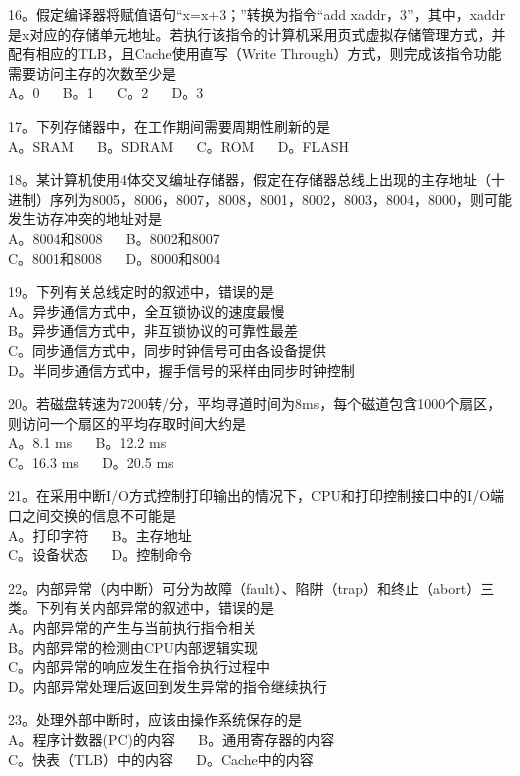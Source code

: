 16。假定编译器将赋值语句“x=x+3；”转换为指令“add xaddr，3”，其中，xaddr是x对应的存储单元地址。若执行该指令的计算机采用页式虚拟存储管理方式，并配有相应的TLB，且Cache使用直写（Write Through）方式，则完成该指令功能需要访问主存的次数至少是 \\
A。0 $\quad$ B。1 $\quad$ C。2 $\quad$ D。3

17。下列存储器中，在工作期间需要周期性刷新的是 \\
A。SRAM $\quad$ B。SDRAM $\quad$ C。ROM $\quad$ D。FLASH

18。某计算机使用4体交叉编址存储器，假定在存储器总线上出现的主存地址（十进制）序列为8005，8006，8007，8008，8001，8002，8003，8004，8000，则可能发生访存冲突的地址对是 \\
A。8004和8008 $\quad$ B。8002和8007 \\
C。8001和8008 $\quad$ D。8000和8004

19。下列有关总线定时的叙述中，错误的是 \\
A。异步通信方式中，全互锁协议的速度最慢 \\
B。异步通信方式中，非互锁协议的可靠性最差 \\
C。同步通信方式中，同步时钟信号可由各设备提供 \\
D。半同步通信方式中，握手信号的采样由同步时钟控制

20。若磁盘转速为7200转/分，平均寻道时间为8ms，每个磁道包含1000个扇区，则访问一个扇区的平均存取时间大约是 \\
A。8.1 ms $\quad$ B。12.2 ms \\
C。16.3 ms $\quad$ D。20.5 ms

21。在采用中断I/O方式控制打印输出的情况下，CPU和打印控制接口中的I/O端口之间交换的信息不可能是 \\
A。打印字符 $\quad$ B。主存地址 \\
C。设备状态 $\quad$ D。控制命令

22。内部异常（内中断）可分为故障（fault）、陷阱（trap）和终止（abort）三类。下列有关内部异常的叙述中，错误的是 \\
A。内部异常的产生与当前执行指令相关 \\
B。内部异常的检测由CPU内部逻辑实现 \\
C。内部异常的响应发生在指令执行过程中 \\
D。内部异常处理后返回到发生异常的指令继续执行

23。处理外部中断时，应该由操作系统保存的是 \\
A。程序计数器(PC)的内容 $\quad$ B。通用寄存器的内容 \\
C。快表（TLB）中的内容 $\quad$ D。Cache中的内容

